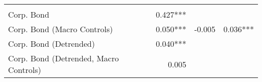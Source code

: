 \begin{table}[!h]
\begin{tabular}{llll}
  \multicolumn{1}{r}{} &
  \multicolumn{1}{r}{} \\
\multicolumn{1}{l}{Corp. Bond} &
  \multicolumn{1}{|r}{0.427***} &
  \multicolumn{1}{r}{} &
  \multicolumn{1}{r}{} \\
\multicolumn{1}{l}{\quad Corp. Bond (Macro Controls)} &
  \multicolumn{1}{|r}{0.050***} &
  \multicolumn{1}{r}{-0.005} &
  \multicolumn{1}{r}{0.036***} \\
\multicolumn{1}{l}{Corp. Bond (Detrended)} &
  \multicolumn{1}{|r}{0.040***} &
  \multicolumn{1}{r}{} &
  \multicolumn{1}{r}{} \\
\multicolumn{1}{l}{\quad Corp. Bond (Detrended, Macro Controls)} &
  \multicolumn{1}{|r}{0.005} &
  \multicolumn{1}{r}{} &
  \multicolumn{1}{r}{} \\
\cline{1-4}
\end{tabular}
\end{table}
